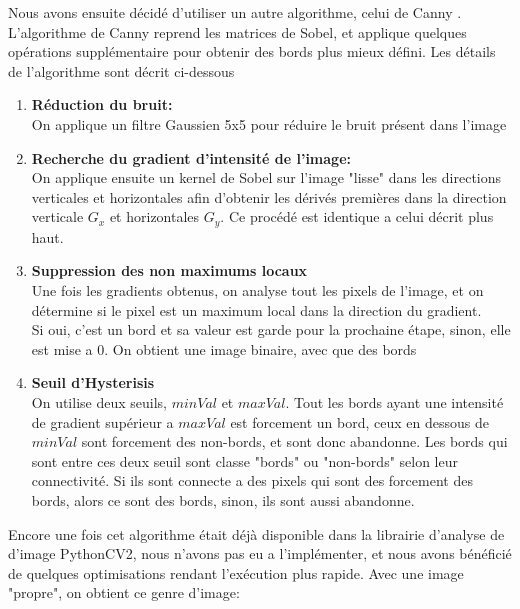 \documentclass[a4paper, 12pt, titlepage, oneside, french]{article}
\begin{document}
	Nous avons ensuite décidé d'utiliser un autre algorithme, celui de Canny \cite{CannyOp}. L'algorithme de Canny reprend les matrices de Sobel, et applique quelques opérations supplémentaire pour obtenir des bords plus mieux défini. Les détails de l'algorithme sont décrit ci-dessous
	\begin{enumerate}
		\item \textbf{Réduction du bruit:}\\
			\indent On applique un filtre Gaussien 5x5 pour réduire le bruit présent dans l'image
		\item \textbf{Recherche du gradient d'intensité de l'image:}\\  
			\indent On applique ensuite un kernel de Sobel sur l'image "lisse" dans les directions verticales et horizontales afin d'obtenir les dérivés premières dans
			la direction verticale $G_x$ et horizontales $G_y$. Ce procédé est identique a celui décrit plus haut.

		\item \textbf{Suppression des non maximums locaux}\\
			\indent Une fois les gradients obtenus, on analyse tout les pixels de l'image, et on détermine si le pixel est un maximum local dans la
			direction du gradient. \\
			Si oui, c'est un bord et sa valeur est garde pour la prochaine étape, sinon, elle est mise a 0. On obtient une image binaire, avec que des bords

		\newpage

		\item \textbf{Seuil d'Hysterisis} \\
			\indent On utilise deux seuils, $minVal$ et $maxVal$. Tout les bords ayant une intensité de gradient supérieur a $maxVal$ est forcement un
			bord, ceux en dessous de $minVal$ sont forcement des non-bords, et sont donc abandonne. Les bords qui sont entre ces deux seuil sont classe
			"bords" ou "non-bords" selon leur connectivité. Si ils sont connecte a des pixels qui sont des forcement des bords, alors ce sont des bords,
			sinon, ils sont aussi abandonne.\\

	\end{enumerate}
	Encore une fois cet algorithme était déjà disponible dans la librairie d'analyse de d'image PythonCV2, nous n'avons pas eu a l'implémenter, et nous avons bénéficié de quelques optimisations rendant l'exécution plus rapide.
	Avec une image "propre", on obtient ce genre d'image:
\end{document}
